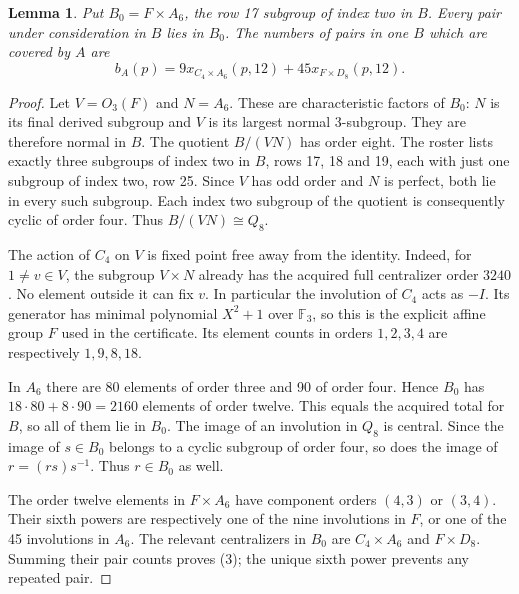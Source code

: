 \documentclass[11pt,a4paper]{article}
\newtheorem{lemma}{Lemma}\newtheorem{theorem}{Theorem}
\begin{document}
\begin{lemma}\label{B}
Put $B_0=F\times A_6$, the row 17 subgroup of index two in $B$.
Every pair under consideration in $B$ lies in $B_0$. The numbers of
pairs in one $B$ which are covered by $A$ are
\[
 b_A(p)=9x_{C_4\times A_6}(p,12)+45x_{F\times D_8}(p,12).
                                                               \tag{3}
\]
\end{lemma}
\begin{proof}
Let $V=O_3(F)$ and $N=A_6$. These are characteristic factors of $B_0$:
$N$ is its final derived subgroup and $V$ is its largest normal
3-subgroup. They are therefore normal in $B$. The quotient $B/(VN)$
has order eight. The roster lists exactly three subgroups of index two
in $B$, rows 17, 18 and 19, each with just one subgroup of index two,
row 25. Since $V$ has odd order and $N$ is perfect, both lie in every
such subgroup. Each index two subgroup of the quotient is consequently
cyclic of order four. Thus $B/(VN)\cong Q_8$.

The action of $C_4$ on $V$ is fixed point free away from the identity.
Indeed, for $1\ne v\in V$, the subgroup $V\times N$ already has the
acquired full centralizer order $3240$. No element outside it can fix
$v$. In particular the involution of $C_4$ acts as $-I$. Its generator
has minimal polynomial $X^2+1$ over $\mathbb F_3$, so this is the
explicit affine group $F$ used in the certificate. Its element counts
in orders $1,2,3,4$ are respectively $1,9,8,18$.

In $A_6$ there are 80 elements of order three and 90 of order four.
Hence $B_0$ has $18\cdot80+8\cdot90=2160$ elements of order twelve.
This equals the acquired total for $B$, so all of them lie in $B_0$.
The image of an involution in $Q_8$ is central. Since the image of
$s\in B_0$ belongs to a cyclic subgroup of order four, so does the
image of $r=(rs)s^{-1}$. Thus $r\in B_0$ as well.

The order twelve elements in $F\times A_6$ have component orders
$(4,3)$ or $(3,4)$. Their sixth powers are respectively one of the nine
involutions in $F$, or one of the 45 involutions in $A_6$. The relevant
centralizers in $B_0$ are $C_4\times A_6$ and $F\times D_8$.
Summing their pair counts proves (3); the unique sixth power prevents
any repeated pair.
\end{proof}
\end{document}
